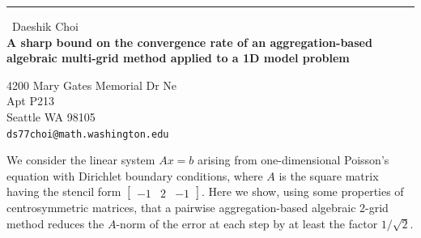 \documentclass{report}
\begin{document}
\begin{center}
\rule{6in}{1pt} \
{\large Daeshik Choi \\
{\bf A sharp bound on the convergence rate of an aggregation-based algebraic multi-grid method applied to a 1D model problem}}

4200 Mary Gates Memorial Dr Ne \\ Apt P213 \\ Seattle WA 98105
\\
{\tt ds77choi@math.washington.edu}\end{center}

We consider the linear system $Ax=b$ arising from one-dimensional
Poisson's equation with Dirichlet boundary conditions, where $A$ is the
square matrix having the stencil form $\begin{bmatrix}-1 & 2 &
-1\end{bmatrix}$. Here we show, using some properties of centrosymmetric
matrices, that
a pairwise aggregation-based algebraic 2-grid method reduces the $A$-norm
of the error at each step by at least the factor $1/\sqrt{2}$.
\end{document}
